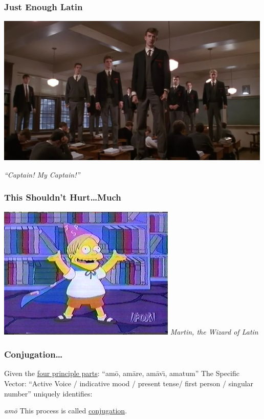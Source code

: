 \documentclass[slidestop,compress,mathserif]{beamer}
\begin{document}
\begin{frame}
	\frametitle{Just Enough Latin}
	\vskip 0.5cm
	\begin{center}
		\includegraphics[scale=0.45]{img/captain.jpg}
	\end{center}
	
	\vskip 0.5cm
	\begin{center}
		\emph{``Captain!  My Captain!''}
	\end{center}
\end{frame}

\begin{frame}
	\frametitle{This Shouldn't Hurt{\ldots}Much}
	\begin{center}
		\includegraphics[scale=0.45]{img/MartinWizard.jpg}
		\vskip 0.5cm
		\emph{Martin, the Wizard of Latin}
	\end{center}			
\end{frame}

\begin{frame}
	\frametitle{Conjugation\ldots}
	Given the \underline{four principle parts}:  ``am\={o}, am\={a}re, am\={a}v\={\i}, amatum''
	\vskip 0.5cm
	The Specific Vector: ``Active Voice / indicative mood / present tense/ first person / singular number'' uniquely identifies:
	\vskip 0.5cm
	\begin{center}
		\emph{am\={o}}
		\vskip 0.5cm
		This process is called \underline{conjugation}.
	\end{center}
\end{frame}
\end{document}
